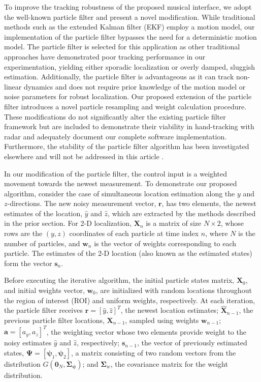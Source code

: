 \documentclass[10pt,journal,final]{IEEEtran}
\begin{document}
To improve the tracking robustness of the proposed musical interface, we adopt the well-known particle filter \cite{garcia2013tracking} and present a novel modification. 
While traditional methods such as the extended Kalman filter (EKF) employ a motion model, our implementation of the particle filter bypasses the need for a deterministic motion model.
The particle filter is selected for this application as other traditional approaches have demonstrated poor tracking performance in our experimentation, yielding either sporadic localization or overly damped, sluggish estimation.
Additionally, the particle filter is advantageous as it can track non-linear dynamics and does not require prior knowledge of the motion model or noise parameters for robust localization.
Our proposed extension of the particle filter introduces a novel particle resampling and weight calculation procedure.
These modifications do not significantly alter the existing particle filter framework but are included to demonstrate their viability in hand-tracking with radar and adequately document our complete software implementation.
Furthermore, the stability of the particle filter algorithm has been investigated elsewhere and will not be addressed in this article \cite{le2004stability}.

In our modification of the particle filter, the control input is a weighted movement towards the newest measurement. 
To demonstrate our proposed algorithm, consider the case of simultaneous location estimation along the $y$ and $z$-directions.
The new noisy measurement vector, $\mathbf{r}$, has two elements, the newest estimates of the location, $\hat{y}$ and $\hat{z}$, which are extracted by the methods described in the prior section.
For 2-D localization, $\mathbf{X}_n$ is a matrix of size $N \times 2$, whose rows are the $(y,z)$ coordinates of each particle at time index $n$, where $N$ is the number of particles, and $\mathbf{w}_n$ is the vector of weights corresponding to each particle.
The estimates of the 2-D location (also known as the estimated states) form the vector $\mathbf{s}_n$.

Before executing the iterative algorithm, the initial particle states matrix, $\mathbf{X}_{0}$, and initial weights vector, $\mathbf{w}_{0}$, are initialized with random locations throughout the region of interest (ROI) and uniform weights, respectively. 
At each iteration, the particle filter receives $\mathbf{r} = [\hat{y},\hat{z}]^T$, the newest location estimates; $\mathbf{\hat{X}}_{n-1}$, the previous particle filter locations, $\mathbf{X}_{n-1}$, sampled using weights $\mathbf{w}_{n-1}$; $\mathbf{a} = [a_y, a_z]^T$, the weighting vector whose two elements provide weight to the noisy estimates $\hat{y}$ and $\hat{z}$, respectively; $\mathbf{s}_{n-1}$, the vector of previously estimated states, $\mathbf{\Psi} = [\bm{\psi}_1, \bm{\psi}_2]$, a matrix consisting of two random vectors from the distribution $G(\mathbf{0}_N,\mathbf{\Sigma_\psi})$; and $\mathbf{\Sigma}_w$, the covariance matrix for the weight distribution.
\end{document}
